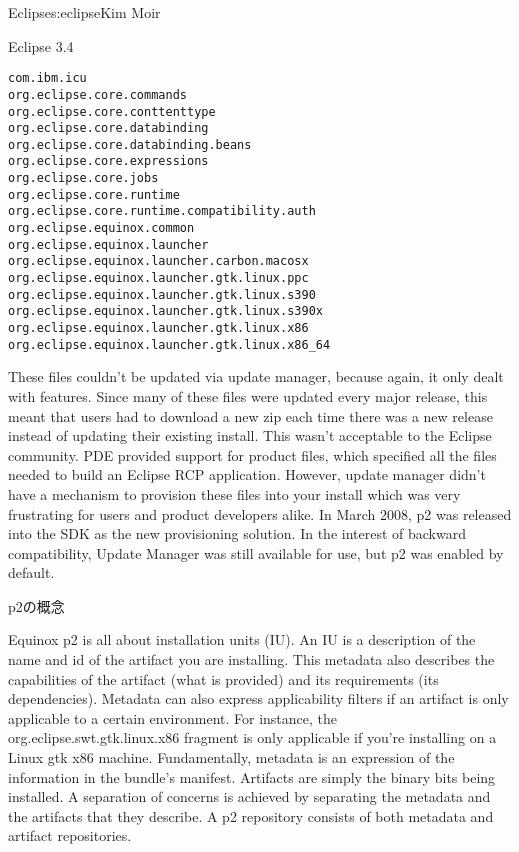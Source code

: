 \begin{aosachapter}{Eclipse}{s:eclipse}{Kim Moir}
\begin{aosasect1}{Eclipse 3.4}
\begin{verbatim}
com.ibm.icu
org.eclipse.core.commands
org.eclipse.core.conttenttype
org.eclipse.core.databinding
org.eclipse.core.databinding.beans
org.eclipse.core.expressions
org.eclipse.core.jobs
org.eclipse.core.runtime
org.eclipse.core.runtime.compatibility.auth
org.eclipse.equinox.common
org.eclipse.equinox.launcher
org.eclipse.equinox.launcher.carbon.macosx
org.eclipse.equinox.launcher.gtk.linux.ppc
org.eclipse.equinox.launcher.gtk.linux.s390
org.eclipse.equinox.launcher.gtk.linux.s390x
org.eclipse.equinox.launcher.gtk.linux.x86
org.eclipse.equinox.launcher.gtk.linux.x86_64
\end{verbatim}


These files couldn't be updated via
update manager, because again, it only dealt with features.
Since many of these files were updated every major release, this meant
that users had to download a new zip each time there was a new release
instead of updating their existing install. This wasn't acceptable to
the Eclipse community. PDE provided support for product files, which
specified all the files needed to build an Eclipse RCP
application. However, update manager didn't have a mechanism to
provision these files into your install which was very frustrating for
users and product developers alike. In March 2008, p2 was released
into the SDK as the new provisioning solution.  In the interest of
backward compatibility, Update Manager was still available for use,
but p2 was enabled by default.

\begin{aosasect2}{p2の概念}

Equinox p2 is all about installation units (IU). An IU is a
description of the name and id of the artifact you are
installing. This metadata also describes the capabilities of the
artifact (what is provided) and its requirements (its
dependencies). Metadata can also express applicability filters if an
artifact is only applicable to a certain environment. For instance,
the org.eclipse.swt.gtk.linux.x86 fragment is only applicable if
you're installing on a Linux gtk x86 machine. Fundamentally, metadata
is an expression of the information in the bundle's
manifest. Artifacts are simply the binary bits being installed. A
separation of concerns is achieved by separating the metadata and the
artifacts that they describe. A p2 repository consists of both
metadata and artifact repositories.


\end{aosasect2}
\end{aosasect1}
\end{aosachapter}
